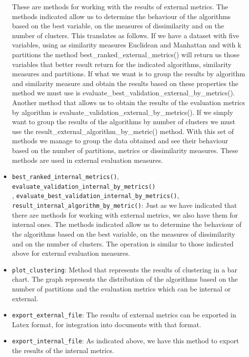 \begin{itemize}
    These are methods for working with the results of external metrics. The methods indicated allow us to determine the behaviour of the algorithms based on the best variable, on the measures of dissimilarity and on the number of clusters. This translates as follows. If we have a dataset with five variables, using as similarity measures Euclidean and Manhattan and with k partitions the method best\_ranked\_external\_metrics() will return us those variables that better result return for the indicated algorithms, similarity measures and partitions. If what we want is to group the results by algorithm and similarity measure and obtain the results based on these properties the method we must use is evaluate\_best\_validation\_external\_by\_metrics(). Another method that allows us to obtain the results of the evaluation metrics by algorithm is evaluate\_validation\_external\_by\_metrics(). If we simply want to group the results of the algorithms by number of clusters we must use the result\_external\_algorithm\_by\_metric() method. With this set of methods we manage to group the data obtained and see their behaviour based on the number of partitions, metrics or dissimilarity measures. These methods are used in external evaluation measures.

    \item \texttt{best\_ranked\_internal\_metrics()}, \texttt{evaluate\_validation\_internal\_by\_metrics()}\\, \texttt{evaluate\_best\_validation\_internal\_by\_metrics()},\\ \texttt{result\_internal\_algorithm\_by\_metric()}: Just as we have indicated that there are methods for working with external metrics, we also have them for internal ones. The methods indicated allow us to determine the behaviour of the algorithms based on the best variable, on the measures of dissimilarity and on the number of clusters. The operation is similar to those indicated above for external evaluation measures.
    \item \texttt{plot\_clustering}: Method that represents the results of clustering in a bar chart. The graph represents the distribution of the algorithms based on the number of partitions and the evaluation metrics which can be internal or external.
    \item \texttt{export\_external\_file}: The results of external metrics can be exported in Latex format, for integration into documents with that format.
    \item \texttt{export\_internal\_file}: As indicated above, we have this method to export the results of the internal metrics.
\end{itemize}

